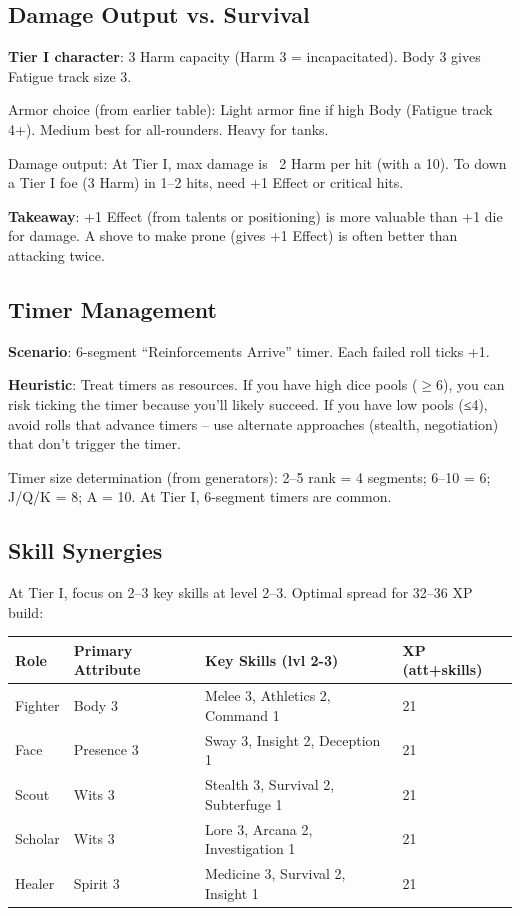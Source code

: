 \documentclass[11pt]{article}
\begin{document}
\subsection{Damage Output vs. Survival}
\textbf{Tier I character}: 3 Harm capacity (Harm 3 = incapacitated). Body 3 gives Fatigue track size 3.

Armor choice (from earlier table): Light armor fine if high Body (Fatigue track 4+). Medium best for all-rounders. Heavy for tanks.

Damage output: At Tier I, max damage is ~2 Harm per hit (with a 10). To down a Tier I foe (3 Harm) in 1--2 hits, need +1 Effect or critical hits.

\textbf{Takeaway}: +1 Effect (from talents or positioning) is more valuable than +1 die for damage. A shove to make prone (gives +1 Effect) is often better than attacking twice.

\subsection{Timer Management}
\textbf{Scenario}: 6-segment ``Reinforcements Arrive'' timer. Each failed roll ticks +1.

\textbf{Heuristic}: Treat timers as resources. If you have high dice pools ($\geq$6), you can risk ticking the timer because you'll likely succeed. If you have low pools (≤4), avoid rolls that advance timers -- use alternate approaches (stealth, negotiation) that don't trigger the timer.

Timer size determination (from generators): 2--5 rank = 4 segments; 6--10 = 6; J/Q/K = 8; A = 10. At Tier I, 6-segment timers are common.

\subsection{Skill Synergies}
At Tier I, focus on 2--3 key skills at level 2--3. Optimal spread for 32--36 XP build:

\begin{table}[h]
\centering
\begin{tabular}{llll}
\toprule
\textbf{Role} & \textbf{Primary Attribute} & \textbf{Key Skills (lvl 2-3)} & \textbf{XP (att+skills)} \\
\midrule
Fighter & Body 3 & Melee 3, Athletics 2, Command 1 & 21 \\
Face & Presence 3 & Sway 3, Insight 2, Deception 1 & 21 \\
Scout & Wits 3 & Stealth 3, Survival 2, Subterfuge 1 & 21 \\
Scholar & Wits 3 & Lore 3, Arcana 2, Investigation 1 & 21 \\
Healer & Spirit 3 & Medicine 3, Survival 2, Insight 1 & 21 \\
\bottomrule
\end{tabular}
\end{table}
\end{document}

